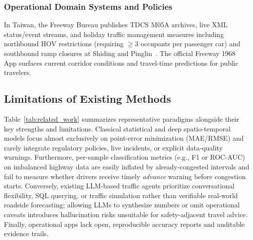 \documentclass[conference]{IEEEtran}
\begin{document}
\subsubsection{Operational Domain Systems and Policies}
In Taiwan, the Freeway Bureau publishes TDCS M05A archives, live XML status/event streams, and holiday traffic management measures including northbound HOV restrictions (requiring $\ge 3$ occupants per passenger car) and southbound ramp closures at Shiding and Pinglin~\cite{tdcs_m05a,freeway2026cny}. The official Freeway 1968 App surfaces current corridor conditions and travel-time predictions for public travelers.

\subsection{Limitations of Existing Methods}
Table~\ref{tab:related_work} summarizes representative paradigms alongside their key strengths and limitations. Classical statistical and deep spatio-temporal models focus almost exclusively on point-error minimization (MAE/RMSE) and rarely integrate regulatory policies, live incidents, or explicit data-quality warnings. Furthermore, per-sample classification metrics (e.g., F1 or ROC-AUC) on imbalanced highway data are easily inflated by already-congested intervals and fail to measure whether drivers receive timely \emph{advance} warning before congestion starts. Conversely, existing LLM-based traffic agents prioritize conversational flexibility, SQL querying, or traffic simulation rather than verifiable real-world roadside forecasting; allowing LLMs to synthesize numbers or omit operational caveats introduces hallucination risks unsuitable for safety-adjacent travel advice. Finally, operational apps lack open, reproducible accuracy reports and auditable evidence trails.
\end{document}
